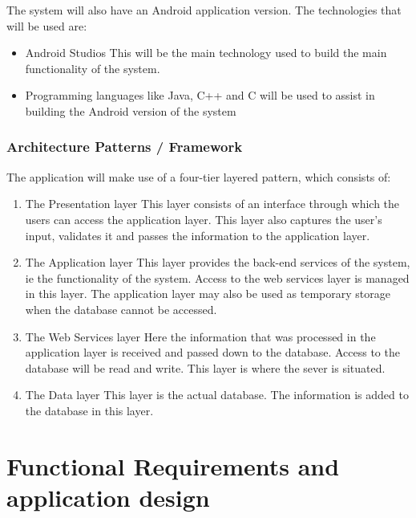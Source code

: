 \documentclass[hidelinks,a4paper,12pt]{article}
\begin{document}
		
		The system will also have an Android application version. The technologies that will be used are:
			\begin{itemize} 
		\item Android Studios
		\newline
		This will be the main technology used to build the main functionality of the system.
		
		\item Programming languages like Java, C++ and C will be used to assist in building the Android version of the system  
		\end{itemize} 
		
		\subsubsection{ Architecture Patterns / Framework }
		
		The application will make use of a four-tier layered pattern, which consists of:
	
	\begin{enumerate} 
			\item The Presentation layer
			\newline
		This layer consists of an interface through which the users can access the application layer. This 	layer also captures the user's input, validates it and passes the information to the application 	layer.
		
			\item The Application layer 
			\newline
		This layer provides the back-end services of the system, ie the functionality of the system. 	Access to the web services layer is managed in this layer. The application layer may also be 	used as temporary storage when the database cannot be accessed.
		
			\item The Web Services layer
			\newline
		Here the information that was processed in the application layer is received and passed 	down to the database. Access to the database will be read and write. This layer is where the 	sever is situated.
		
			\item The Data layer
			\newline
		This layer is the actual database. The information is added to the database in this layer.
	\end{enumerate}
	
	\section{Functional Requirements and application design}
\end{document}
